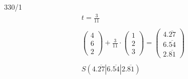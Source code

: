 \begin{exercise}{330/1}
\begin{gather*}
    t = \frac{3}{11} \\\\
    \begin{pmatrix}4 \\ 6 \\ 2\end{pmatrix} + \frac{3}{11} \cdot \begin{pmatrix}1 \\ 2 \\ 3\end{pmatrix} = \begin{pmatrix}4.\overline{27} \\ 6.\overline{54} \\ 2.\overline{81}\end{pmatrix} \\\\
    S(4.\overline{27}|6.\overline{54}|2.\overline{81})
  \end{gather*}
\end{exercise}
